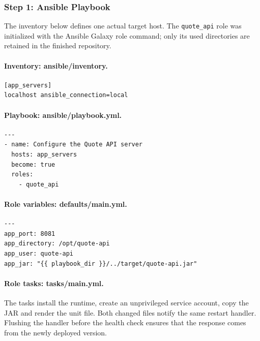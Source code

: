 \documentclass[12pt,a4paper]{article}
\begin{document}
\subsubsection*{Step 1: Ansible Playbook}
The inventory below defines one actual target host. The \texttt{quote\_api} role was initialized with the Ansible Galaxy role command; only its used directories are retained in the finished repository.
\paragraph{Inventory: ansible/inventory.}

\begin{lstlisting}[language={}]
[app_servers]
localhost ansible_connection=local
\end{lstlisting}

\paragraph{Playbook: ansible/playbook.yml.}

\begin{lstlisting}[language={}]
---
- name: Configure the Quote API server
  hosts: app_servers
  become: true
  roles:
    - quote_api
\end{lstlisting}

\paragraph{Role variables: defaults/main.yml.}

\begin{lstlisting}[language={}]
---
app_port: 8081
app_directory: /opt/quote-api
app_user: quote-api
app_jar: "{{ playbook_dir }}/../target/quote-api.jar"
\end{lstlisting}


\paragraph{Role tasks: tasks/main.yml.}
The tasks install the runtime, create an unprivileged service account, copy the JAR and render the unit file. Both changed files notify the same restart handler. Flushing the handler before the health check ensures that the response comes from the newly deployed version.
\end{document}
